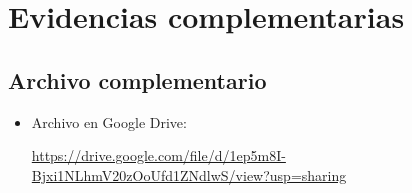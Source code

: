 \chapter{Evidencias complementarias}


\section{Archivo complementario}

\begin{itemize}
    \item Archivo en Google Drive:

    \url{https://drive.google.com/file/d/1ep5m8I-Bjxi1NLhmV20zOoUfd1ZNdlwS/view?usp=sharing}
\end{itemize}
